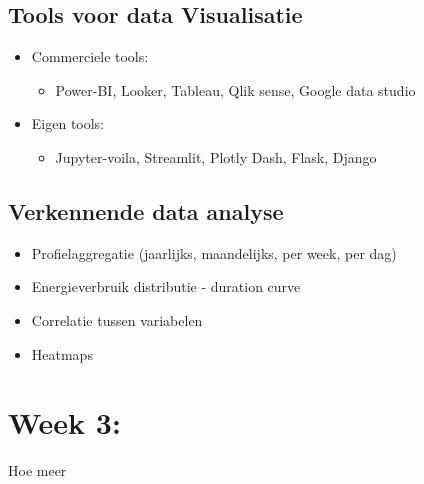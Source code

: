 \documentclass[12pt]{article}
\begin{document}
\subsection{Tools voor data Visualisatie}
\begin{itemize}
    \item Commerciele tools:\begin{itemize}
        \item Power-BI, Looker, Tableau, Qlik sense, Google data studio
    \end{itemize}
    \item Eigen tools:\begin{itemize}
        \item Jupyter-voila, Streamlit, Plotly Dash, Flask, Django
    \end{itemize}
\end{itemize}
\subsection{Verkennende data analyse}
\begin{itemize}
    \item Profielaggregatie (jaarlijks, maandelijks, per week, per dag) 
    \item Energieverbruik distributie - duration curve 
    \item Correlatie tussen variabelen
    \item Heatmaps
\end{itemize}
\section{Week 3:}
Hoe meer 
\end{document}

